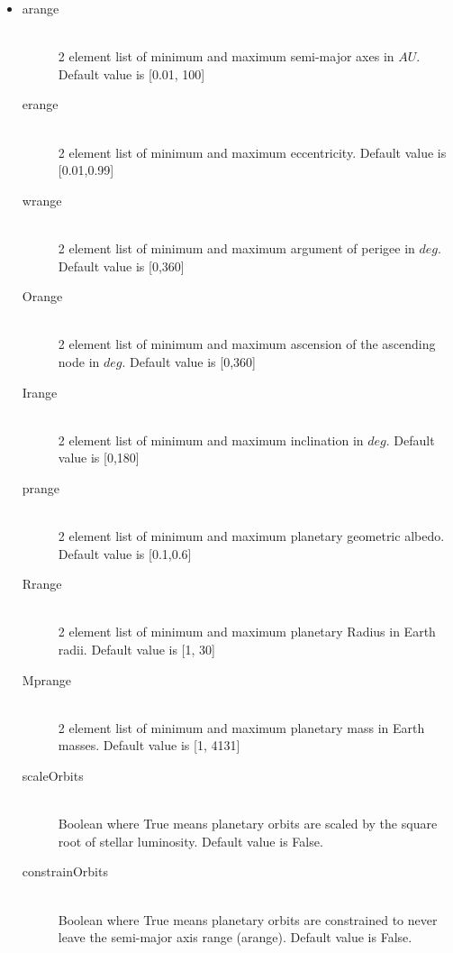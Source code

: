 \documentclass[cleanfoot]{asme2ej}
\begin{document}
\begin{itemize}
\item
\begin{description}
    \item[arange] \hfill \\
    2 element list of minimum and maximum semi-major axes in $ AU $. Default value is [0.01, 100]
    \item[erange] \hfill \\
    2 element list of minimum and maximum eccentricity.  Default value is [0.01,0.99]
    \item[wrange] \hfill \\
    2 element list of minimum and maximum argument of perigee in $ deg $.  Default value is [0,360]
    \item[Orange] \hfill \\
    2 element list of minimum and maximum ascension of the ascending node in $ deg $.  Default value is [0,360]
    \item[Irange] \hfill \\
    2 element list of minimum and maximum inclination in $ deg $.  Default value is [0,180]
    \item[prange] \hfill \\
    2 element list of minimum and maximum planetary geometric albedo.  Default value is [0.1,0.6]
     \item[Rrange] \hfill \\
    2 element list of minimum and maximum planetary Radius in Earth radii.  Default value is [1, 30]
    \item[Mprange] \hfill \\
    2 element list of minimum and maximum planetary mass in Earth masses.  Default value is [1, 4131]
    \item [scaleOrbits] \hfill \\
    Boolean where True means planetary orbits are scaled by the square root of stellar luminosity. Default value is False.
    \item[constrainOrbits] \hfill \\
    Boolean where True means planetary orbits are constrained to never leave the semi-major axis range (arange). Default value is False.
\end{description}
\end{itemize}
\end{document}
